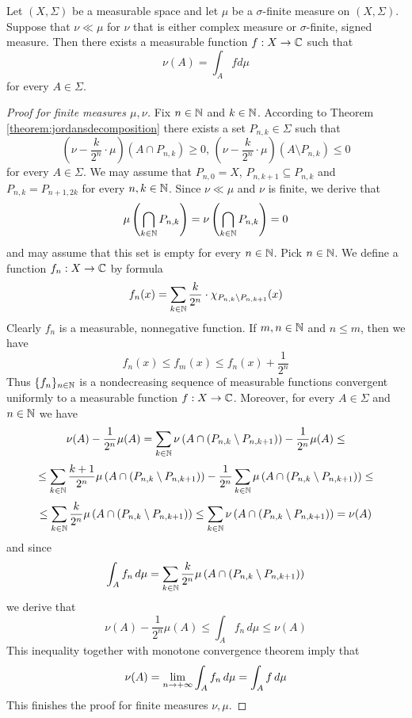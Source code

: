 \begin{theorem}\label{theorem:radonnikodymmain}
Let $(X,\Sigma)$ be a measurable space and let $\mu$ be a $\sigma$-finite measure on $(X,\Sigma)$. Suppose that $\nu \ll \mu$ for $\nu$ that is either complex measure or $\sigma$-finite, signed measure. Then there exists a measurable function $f:X\rightarrow {\mathbb C}$ such that
$$\nu(A) = \int_A f d\mu$$
for every $A\in \Sigma$.
\end{theorem}
\begin{proof}[Proof for finite measures $\mu,\nu$]
Fix $n\in {\mathbb N}$ and $k\in {\mathbb N}$. According to Theorem \ref{theorem:jordansdecomposition} there exists a set $P_{n,k}\in \Sigma$ such that
$$\left(\nu - \frac{k}{2^n}\cdot \mu\right)\left(A\cap P_{n,k}\right)\geq 0,\,\left(\nu - \frac{k}{2^n}\cdot \mu\right)\left(A\setminus P_{n,k}\right)\leq 0$$
for every $A\in \Sigma$. We may assume that $P_{n,0}=X$, $P_{n,k+1}\subseteq P_{n,k}$ and $P_{n,k} =P_{n+1,2k}$ for every $n, k\in {\mathbb N}$. Since $\nu \ll \mu$ and $\nu$ is finite, we derive that
$$\mu\left(\bigcap_{k\in {\mathbb N}}P_{n,k}\right) = \nu\left(\bigcap_{k\in {\mathbb N}}P_{n,k}\right)=0$$
and may assume that this set is empty for every $n\in {\mathbb N}$. Pick $n\in {\mathbb N}$. We define a function $f_n:X\rightarrow {\mathbb C}$ by formula
$$f_n(x) =\sum_{k\in {\mathbb N}} \frac{k}{2^n}\cdot \chi_{P_{n,k}\setminus P_{n,k+1}}(x)$$
Clearly $f_n$ is a measurable, nonnegative function. If $m,n\in {\mathbb N}$ and $n\leq m$, then we have
$$f_n(x)\leq f_m(x)\leq f_n(x)+\frac{1}{2^n}$$
Thus $\{f_n\}_{n\in {\mathbb N}}$ is a nondecreasing sequence of measurable functions convergent uniformly to a measurable function $f:X\rightarrow {\mathbb C}$. Moreover, for every $A\in \Sigma$ and $n\in {\mathbb N}$ we have
$$\nu(A)-\frac{1}{2^n}\mu(A) = \sum_{k\in {\mathbb N}}\nu\left(A\cap \left(P_{n,k}\setminus P_{n,k+1}\right)\right)-\frac{1}{2^n}\mu(A)  \leq$$
$$\leq \sum_{k\in {\mathbb N}}\frac{k+1}{2^n}\mu\left(A\cap \left(P_{n,k}\setminus P_{n,k+1}\right)\right) - \frac{1}{2^n}\sum_{k\in {\mathbb N}}\mu\left(A\cap \left(P_{n,k}\setminus P_{n,k+1}\right)\right) \leq  $$
$$\leq  \sum_{k\in {\mathbb N}}\frac{k}{2^n}\mu\left(A\cap \left(P_{n,k}\setminus P_{n,k+1}\right)\right)\leq \sum_{k\in {\mathbb N}}\nu\left(A\cap \left(P_{n,k}\setminus P_{n,k+1}\right)\right) = \nu(A)$$
and since
$$\int_Af_n\,d\mu =  \sum_{k\in {\mathbb N}}\frac{k}{2^n}\mu\left(A\cap \left(P_{n,k}\setminus P_{n,k+1}\right)\right)$$
we derive that
$$\nu(A)-\frac{1}{2^n}\mu(A) \leq \int_Af_n\,d\mu \leq \nu(A)$$
This inequality together with monotone convergence theorem imply that
$$\nu(A) =  \lim_{n\rightarrow +\infty}\int_Af_n\,d\mu = \int_Af\,d\mu$$
This finishes the proof for finite measures $\nu,\mu$.
\end{proof}

